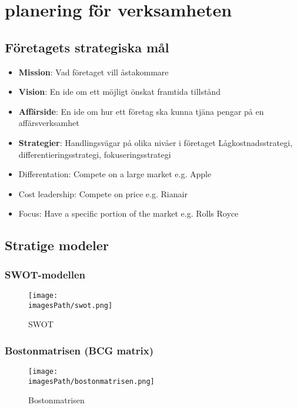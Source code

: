 \documentclass{article}
\newcommand{\imagesPath}{images}
\begin{document}
\section{planering för verksamheten}
\subsection{Företagets strategiska mål}
\begin{itemize}
    \item \textbf{Mission}: \newline
    Vad företaget vill åstakommare
    \item \textbf{Vision}: \newline
    En ide om ett möjligt önskat framtida tillstånd
    \item \textbf{Affärside}: \newline
    En ide om hur ett företag ska kunna tjäna pengar på en affärsverksamhet
    \item \textbf{Strategier}: \newline 
    Handlingsvägar på olika nivåer i företaget \newline
    Lågkostnadsstrategi, differentieringsstrategi, fokuseringsstrategi
\end{itemize}

\begin{itemize}
    \item Differentation: Compete on a large market e.g. Apple
    \item Cost leadership: Compete on price e.g. Rianair
    \item Focus: Have a specific portion of the market e.g. Rolls Royce
\end{itemize}

\newpage
\subsection{Stratige modeler}
\subsubsection{SWOT-modellen}
\begin{figure}[!h]
    \centering
    \texttt{[image: \\imagesPath/swot.png]}
    \caption{SWOT}
\end{figure}

\subsubsection{Bostonmatrisen (BCG matrix)}
\begin{figure}[!h]
    \centering
    \texttt{[image: \\imagesPath/bostonmatrisen.png]}
    \caption{Bostonmatrisen}
\end{figure}
\end{document}
